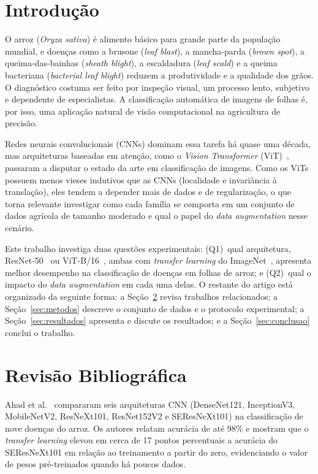 \documentclass[conference]{IEEEtran}
\begin{document}
\section{Introdução}
O arroz (\textit{Oryza sativa}) é alimento básico para grande parte da população mundial, e doenças como a brusone (\textit{leaf blast}), a mancha-parda (\textit{brown spot}), a queima-das-bainhas (\textit{sheath blight}), a escaldadura (\textit{leaf scald}) e a queima bacteriana (\textit{bacterial leaf blight}) reduzem a produtividade e a qualidade dos grãos. O diagnóstico costuma ser feito por inspeção visual, um processo lento, subjetivo e dependente de especialistas. A classificação automática de imagens de folhas é, por isso, uma aplicação natural de visão computacional na agricultura de precisão.

Redes neurais convolucionais (CNNs) dominam essa tarefa há quase uma década, mas arquiteturas baseadas em atenção, como o \textit{Vision Transformer} (ViT)~\cite{dosovitskiy2021vit}, passaram a disputar o estado da arte em classificação de imagens. Como os ViTs possuem menos vieses indutivos que as CNNs (localidade e invariância à translação), eles tendem a depender mais de dados e de regularização, o que torna relevante investigar como cada família se comporta em um conjunto de dados agrícola de tamanho moderado e qual o papel do \textit{data augmentation} nesse cenário.

Este trabalho investiga duas questões experimentais: (Q1)~qual arquitetura, ResNet-50~\cite{he2016resnet} ou ViT-B/16~\cite{dosovitskiy2021vit}, ambas com \textit{transfer learning} do ImageNet~\cite{deng2009imagenet}, apresenta melhor desempenho na classificação de doenças em folhas de arroz; e (Q2)~qual o impacto do \textit{data augmentation} em cada uma delas. O restante do artigo está organizado da seguinte forma: a Seção~\ref{sec:revisao} revisa trabalhos relacionados; a Seção~\ref{sec:metodos} descreve o conjunto de dados e o protocolo experimental; a Seção~\ref{sec:resultados} apresenta e discute os resultados; e a Seção~\ref{sec:conclusao} conclui o trabalho.

\section{Revisão Bibliográfica}\label{sec:revisao}
Ahad et al.~\cite{ahad2023comparison} compararam seis arquiteturas CNN (DenseNet121, InceptionV3, MobileNetV2, ResNeXt101, ResNet152V2 e SEResNeXt101) na classificação de nove doenças do arroz. Os autores relatam acurácia de até 98\% e mostram que o \textit{transfer learning} elevou em cerca de 17 pontos percentuais a acurácia do SEResNeXt101 em relação ao treinamento a partir do zero, evidenciando o valor de pesos pré-treinados quando há poucos dados.
\end{document}
